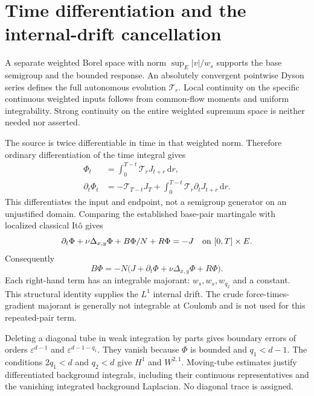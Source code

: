 \documentclass[10pt]{article}
\newcommand{\dd}{\,\mathrm d}
\begin{document}
\section*{Time differentiation and the internal-drift cancellation}
A separate weighted Borel space with norm $\sup_E|v|/w_s$ supports the base
semigroup and the bounded response. An absolutely convergent pointwise Dyson
series defines the full autonomous evolution $\mathcal T_r$. Local continuity
on the specific continuous weighted inputs follows from common-flow moments
and uniform integrability. Strong continuity on the entire weighted supremum
space is neither needed nor asserted.

The source is twice differentiable in time in that weighted norm. Therefore
ordinary differentiation of the time integral gives
\begin{align*}
 \Phi_t&=\int_0^{T-t}\mathcal T_rJ_{t+r}\dd r,\\
 \partial_t\Phi_t&=-\mathcal T_{T-t}J_T+
          \int_0^{T-t}\mathcal T_r\partial_tJ_{t+r}\dd r.
\end{align*}
This differentiates the input and endpoint, not a semigroup generator on an
unjustified domain. Comparing the established base-pair martingale with
localized classical It\^o gives
\[
 \partial_t\Phi+\nu\Delta_{x,y}\Phi+B\Phi/N+R\Phi=-J
 \quad\hbox{on }[0,T]\times E.
\]
Consequently
\[
 B\Phi=-N\bigl(J+\partial_t\Phi+\nu\Delta_{x,y}\Phi+R\Phi\bigr).
\]
Each right-hand term has an integrable majorant: $w_s,w_s,w_{q_2}$ and a
constant. This structural identity supplies the $L^1$ internal drift.
The crude force-times-gradient majorant is generally not integrable at
Coulomb and is not used for this repeated-pair term.

Deleting a diagonal tube in weak integration by parts gives boundary errors
of orders $\varepsilon^{d-1}$ and $\varepsilon^{d-1-q_1}$.
They vanish because $\Phi$ is bounded and $q_1<d-1$.
The conditions $2q_1<d$ and $q_2<d$ give $H^1$ and $W^{2,1}$.
Moving-tube estimates justify differentiated background integrals, including
their continuous representatives and the vanishing integrated background
Laplacian. No diagonal trace is assigned.
\end{document}
